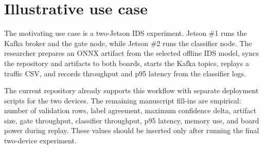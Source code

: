 \section{Illustrative use case}

The motivating use case is a two-Jetson IDS experiment. Jetson \#1 runs the Kafka broker and the gate node, while Jetson \#2 runs the classifier node. The researcher prepares an ONNX artifact from the selected offline IDS model, syncs the repository and artifacts to both boards, starts the Kafka topics, replays a traffic CSV, and records throughput and p95 latency from the classifier logs.

The current repository already supports this workflow with separate deployment scripts for the two devices. The remaining manuscript fill-ins are empirical: number of validation rows, label agreement, maximum confidence delta, artifact size, gate throughput, classifier throughput, p95 latency, memory use, and board power during replay. These values should be inserted only after running the final two-device experiment.
